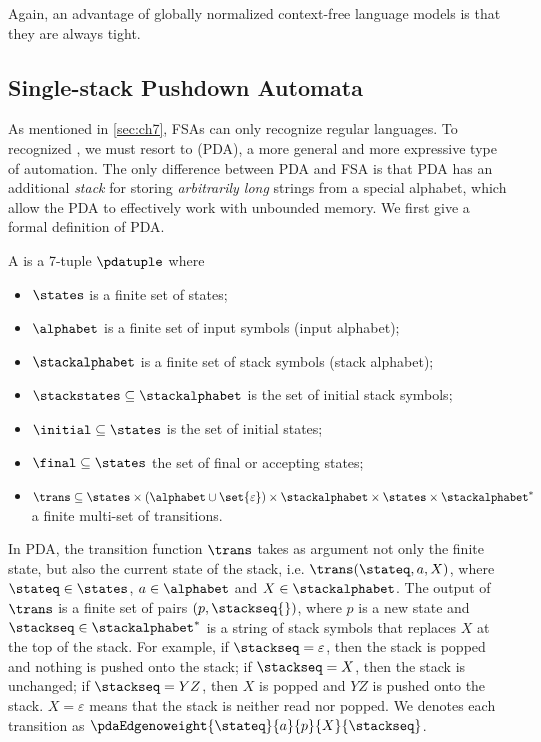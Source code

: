 Again, an advantage of globally normalized context-free language models is that they are always tight.

\subsection{Single-stack Pushdown Automata}


As mentioned in \cref{sec:ch7}, FSAs can only recognize regular languages. To recognized , we must resort to (PDA), a more general and more expressive type of automation.
The only difference between PDA and FSA is that PDA has an additional \emph{stack} for storing \emph{arbitrarily long} strings from a special alphabet, which allow the PDA to effectively work with unbounded memory.
We first give a formal definition of PDA.

\begin{definition}
A  is a 7-tuple $\pdatuple$ where
\begin{itemize}
    \item $\states$ is a finite set of states;
    \item $\alphabet$ is a finite set of input symbols (input alphabet);
    \item $\stackalphabet$ is a finite set of stack symbols (stack alphabet);
    \item $\stackstates \subseteq \stackalphabet$ is the set of initial stack symbols;
    \item $\initial \subseteq \states$ is the set of initial states; 
    \item $\final \subseteq \states$ the set of final or accepting states;
    \item $\trans \subseteq \states \times \left( \alphabet \cup  \set{\varepsilon} \right) \times \stackalphabet \times \states \times \stackalphabet^*$ a finite multi-set of transitions.
\end{itemize}
\end{definition}

In PDA, the transition function $\trans$ takes as argument not only the finite state, but also the current state of the stack, i.e. $\trans(\stateq, a, X)$, where $\stateq \in \states$, $a \in \alphabet$ and $X \in \stackalphabet$. The output of $\trans$ is a finite set of pairs $\left(p, \stackseq{}\right)$, where $p$ is a new state and $\stackseq \in \stackalphabet^*$ is a string of stack symbols that replaces $X$ at the top of the stack. For example, if $\stackseq = \varepsilon$, then the stack is popped and nothing is pushed onto the stack; if $\stackseq = X$, then the stack is unchanged; if $\stackseq = YZ$, then $X$ is popped and $YZ$ is pushed onto the stack. $X = \varepsilon$ means that the stack is neither read nor popped. We denotes each transition as $\pdaEdgenoweight{\stateq}{a}{p}{X}{\stackseq}$.

